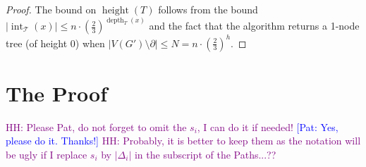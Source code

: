 \documentclass{patmorin}
\newcommand{\pat}[1]{\textcolor{Blue}{[Pat: #1]}}
\DeclareMathOperator{\sep}{sn}
\DeclareMathOperator{\tw}{tw}
\DeclareMathOperator{\depth}{depth}
\DeclareMathOperator{\height}{height}
\DeclareMathOperator{\interior}{int}
\newcommand{\hussein}[1]{\textcolor{purple}{HH: #1}}
\begin{document}
\begin{proof}
  The bound on $\height(T)$ follows from the bound $|\interior_{\mathcal{T}}(x)|\le n\cdot (\tfrac{2}{3})^{\depth_T(x)}$ and the fact that the algorithm returns a 1-node tree (of height $0$) when $|V(G')\setminus\partial|\le N=n\cdot(\tfrac{2}{3})^h$.
\end{proof}










\section{The Proof}

\hussein{Please Pat, do not forget to omit the $s_{i}$, I can do it if needed!}
\pat{Yes, please do it. Thanks!} \hussein{Probably, it is better to keep them as the notation will be ugly if I replace $s_i$ by $|\Delta_i|$ in the subscript of the Paths...??}
\end{document}
